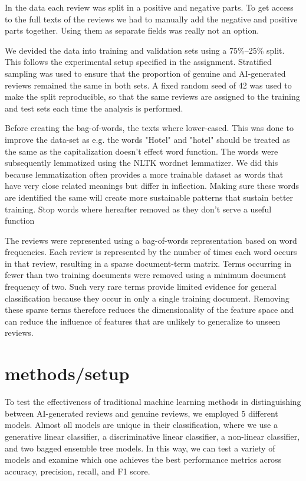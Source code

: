 \documentclass{article}
\begin{document}
In the data each review was split in a positive and negative parts. To get access to the full texts of the reviews we had to manually add the negative and positive parts together. Using them as separate fields was really not an option.

We devided the data into training and validation sets using a 75\%--25\% split. This follows the experimental setup specified in the assignment. Stratified sampling was used to ensure that the proportion of genuine and AI-generated reviews remained the same in both sets. A fixed random seed of 42 was used to make the split reproducible, so that the same reviews are assigned to the training and test sets each time the analysis is performed.

Before creating the bag-of-words, the texts where lower-cased. This was done to improve the data-set as e.g. the words "Hotel" and "hotel" should be treated as the same as the capitalization doesn't effect word function. The words were subsequently lemmatized using the NLTK wordnet lemmatizer. We did this because lemmatization often provides a more trainable dataset as words that have very close related meanings but differ in inflection. Making sure these words are identified the same will create more sustainable patterns that sustain better training. Stop words where hereafter removed as they don't serve a useful function

The reviews were represented using a bag-of-words representation based on word frequencies. Each review is represented by the number of times each word occurs in that review, resulting in a sparse document-term matrix. Terms occurring in fewer than two training documents were removed using a minimum document frequency of two. Such very rare terms provide limited evidence for general classification because they occur in only a single training document. Removing these sparse terms therefore reduces the dimensionality of the feature space and can reduce the influence of features that are unlikely to generalize to unseen reviews.

\section{methods/setup}
To test the effectiveness of traditional machine learning methods in distinguishing between AI-generated reviews and genuine reviews, we employed 5 different models. Almost all models are unique in their classification, where we use a generative linear classifier, a discriminative linear classifier, a non-linear classifier, and two bagged ensemble tree models. In this way, we can test a variety of models and examine which one achieves the best performance metrics across accuracy, precision, recall, and F1 score. 
\end{document}
